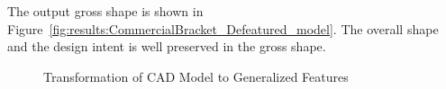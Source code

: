 

The output gross shape is shown in Figure~\ref{fig:results:CommercialBracket_Defeatured_model}. The overall shape and the design intent is well preserved in the gross shape.


\begin{figure}[!h]
\centering     %
{}\quad
{}
\caption{Transformation of CAD Model to Generalized Features}\label{fig:results:CommercialBracketable}
\end{figure}


